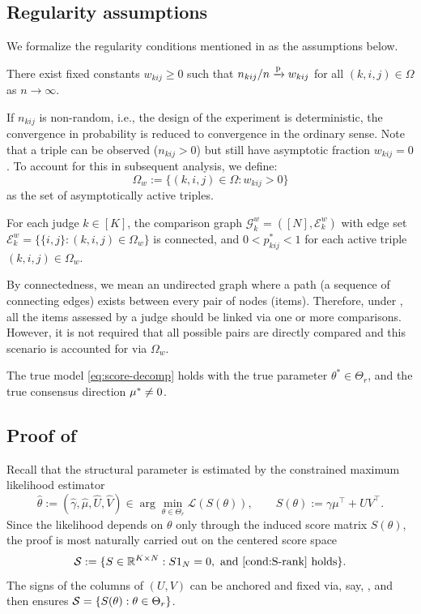 \documentclass{article}
\begin{document}
\begin{bibunit}[unsrtnat]
\subsection{Regularity assumptions} \label{subsec:asm}
We formalize the regularity conditions mentioned in  as the assumptions below.
\begin{assumption}
\label{asm:sampling}
There exist fixed constants $w_{kij} \geq 0$ such that
\({n_{kij}}/{n} \xrightarrow{\textup{p}} w_{kij}\) for all \((k,i,j)\in\Omega\) as \(n\to\infty\).
\end{assumption}
If $n_{kij}$ is non-random, i.e., the design of the experiment is deterministic, the convergence in probability is reduced to convergence in the ordinary sense.
Note that a triple can be observed ($n_{kij}>0$) but still have asymptotic fraction $w_{kij}=0$. To account for this in subsequent analysis, we define:
\begin{equation}\label{eq:active-graph}
    \Omega_w:=\{(k,i,j)\in\Omega:w_{kij}>0\}
\end{equation}
as the set of asymptotically active triples.
\begin{assumption}
\label{asm:graph}
For each judge $k \in [K]$, the comparison graph $\mathcal{G}_k^w = ([N], \mathcal{E}_k^w)$ with edge set $\mathcal{E}_k^w = \{\{i,j\} : (k,i,j) \in \Omega_w\}$ is connected, and $0<p_{kij}^*<1$ for each active triple \((k,i,j)\in\Omega_w\).
\end{assumption}
By connectedness, we mean an undirected graph where a path (a sequence of connecting edges) exists between every pair of nodes (items). Therefore, under , all the items assessed by a judge should be linked via one or more comparisons. However, it is not required that all possible pairs are directly compared and this scenario is accounted for via $\Omega_w$.
\begin{assumption}
\label{asm:score-space}
    The true model \eqref{eq:score-decomp} holds with the true parameter $\theta^*\in \Theta_r$, and the true consensus direction $\mu^*\neq 0$. 
\end{assumption}
\subsection[Proof of Theorem 2]{Proof of } \label{app:mle-proof}
Recall that the structural parameter is estimated by the constrained maximum likelihood estimator
\[
\hat{\theta}:=(\hat{\gamma},\hat{\mu},\hat{U},\hat{V})
\in
\arg\min_{\theta\in\Theta_{r}}\mathcal{L}(S(\theta)),
\qquad
S(\theta):=\gamma\mu^\top+UV^\top.
\]
Since the likelihood depends on $\theta$ only through the induced score matrix $S(\theta)$, the proof is most naturally carried out on the centered score space
\[
\mathcal{S}:=\{S\in\RR^{K\times N}: S\one_N=\zero, \text{ and \Cref{cond:S-rank} holds}\}.
\]
The signs of the columns of $(U,V)$ can be anchored and fixed via, say, , and then  ensures ${\mathcal{S}}=\{S(\theta):\theta\in\Theta_r\}$.


\end{bibunit}
\end{document}
